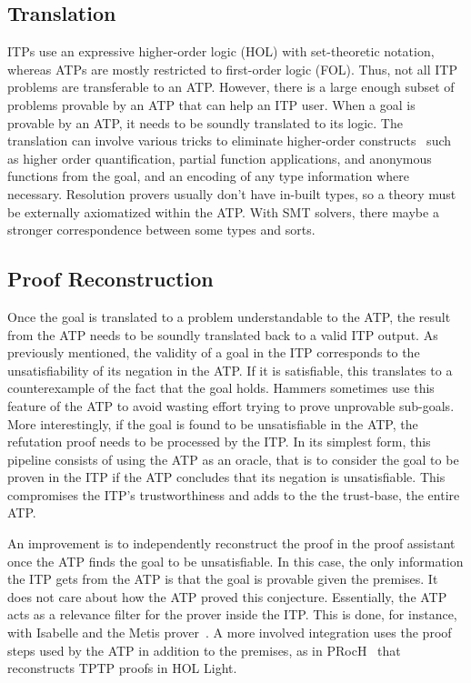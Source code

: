 \documentclass{article}
\begin{document}
		\subsection{Translation}
		ITPs use an expressive higher-order logic
		(HOL) with set-theoretic notation, whereas ATPs 
		are mostly restricted to first-order logic (FOL). 
		Thus, not all ITP problems are transferable to 
		an ATP. However, there is a large enough subset 
		of problems provable by an ATP that can help an 
		ITP user. When a goal is provable by an ATP, it 
		needs to be soundly translated to its logic. 
		The translation can involve various tricks to 
		eliminate higher-order 
		constructs~\cite{DBLP:journals/jar/MengP08} 
		such as higher order quantification, partial 
		function applications, and anonymous functions
		from the goal, and an encoding of any 
		type information where necessary. Resolution 
		provers usually don't have in-built types, so a 
		theory must be externally axiomatized within the 
		ATP. With SMT solvers, there maybe a stronger
		correspondence between some types and 
		sorts.
	
		\subsection{Proof Reconstruction}
		Once the goal is translated to a problem understandable 
		to the ATP, the result from the ATP needs to be 
		soundly translated back to a valid ITP output.
		As previously mentioned, the validity of a goal in 
		the ITP corresponds to the unsatisfiability of its 
		negation in the ATP. If it is satisfiable, this 
		translates to a counterexample of the fact that 
		the goal holds. Hammers sometimes use this 
		feature of the ATP to avoid wasting effort 
		trying to prove unprovable sub-goals. More 
		interestingly, if the goal is found to be 
		unsatisfiable in the ATP, the refutation proof 
		needs to be processed by the ITP. In its simplest 
		form, this pipeline consists 
		of using the ATP as an oracle, that is to consider 
		the goal to be proven in the ITP if the ATP 
		concludes that its negation is unsatisfiable. 
		This compromises the ITP's trustworthiness and adds 
		to the the trust-base, the entire ATP.
		
		An improvement is to independently reconstruct 
		the proof in the proof assistant once the ATP finds 
		the goal to be unsatisfiable. In this case, the 
		only information the ITP gets from the ATP is that 
		the goal is provable given the premises. It does 
		not care about how the ATP proved this conjecture.
		Essentially, the ATP acts as a relevance filter for 
		the prover inside the ITP. This is done, for instance, 
		with Isabelle and the Metis 
		prover~\cite{10.1007/978-3-540-74591-4_18}. A more
		involved integration uses the proof steps used by 
		the ATP in addition to the premises, as in 
		PRocH~\cite{10.1007/978-3-642-38574-2_18} that reconstructs TPTP proofs in HOL Light.
		
\end{document}
